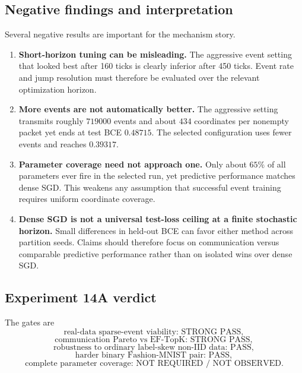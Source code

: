 \subsection{Negative findings and interpretation}

Several negative results are important for the mechanism story.
\begin{enumerate}
    \item \textbf{Short-horizon tuning can be misleading.} The aggressive event setting that looked best after 160 ticks is clearly inferior after 450 ticks. Event rate and jump resolution must therefore be evaluated over the relevant optimization horizon.
    \item \textbf{More events are not automatically better.} The aggressive setting transmits roughly $719000$ events and about $434$ coordinates per nonempty packet yet ends at test BCE $0.48715$. The selected configuration uses fewer events and reaches $0.39317$.
    \item \textbf{Parameter coverage need not approach one.} Only about $65\%$ of all parameters ever fire in the selected run, yet predictive performance matches dense SGD. This weakens any assumption that successful event training requires uniform coordinate coverage.
    \item \textbf{Dense SGD is not a universal test-loss ceiling at a finite stochastic horizon.} Small differences in held-out BCE can favor either method across partition seeds. Claims should therefore focus on communication versus comparable predictive performance rather than on isolated wins over dense SGD.
\end{enumerate}

\subsection{Experiment 14A verdict}

The gates are
\begin{equation}
\boxed{\text{real-data sparse-event viability: STRONG PASS}},
\end{equation}
\begin{equation}
\boxed{\text{communication Pareto vs EF-TopK: STRONG PASS}},
\end{equation}
\begin{equation}
\boxed{\text{robustness to ordinary label-skew non-IID data: PASS}},
\end{equation}
\begin{equation}
\boxed{\text{harder binary Fashion-MNIST pair: PASS}},
\end{equation}
\begin{equation}
\boxed{\text{complete parameter coverage: NOT REQUIRED / NOT OBSERVED}}.
\end{equation}

